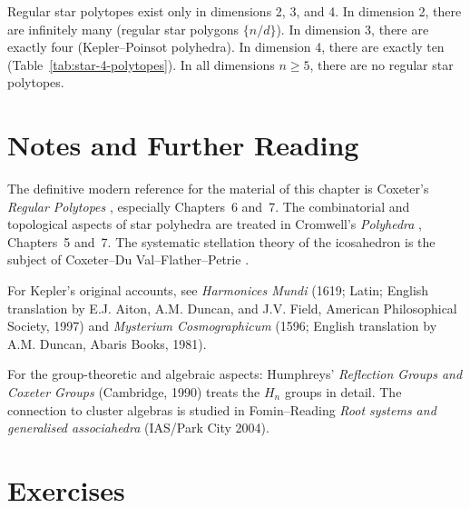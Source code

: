 \begin{theorem}
\label{thm:summary-higher-dim}
Regular star polytopes exist only in dimensions 2, 3, and 4.
In dimension 2, there are infinitely many (regular star polygons
$\{n/d\}$).  In dimension 3, there are exactly four
(Kepler–Poinsot polyhedra).  In dimension 4, there are exactly
ten (Table~\ref{tab:star-4-polytopes}).  In all dimensions
$n \geq 5$, there are no regular star polytopes.
\end{theorem}

\section{Notes and Further Reading}
\label{sec:notes}

The definitive modern reference for the material of this
chapter is Coxeter's \emph{Regular Polytopes}
\cite{coxeter_regular_polytopes}, especially Chapters~6 and~7.
The combinatorial and topological aspects of star polyhedra
are treated in Cromwell's \emph{Polyhedra}
\cite{cromwell_polyhedra}, Chapters~5 and~7.  The systematic
stellation theory of the icosahedron is the subject of
Coxeter–Du Val–Flather–Petrie \cite{coxeter_fifty_nine_icosahedra}.

For Kepler's original accounts, see \emph{Harmonices Mundi}
(1619; Latin; English translation by E.J. Aiton, A.M. Duncan,
and J.V. Field, American Philosophical Society, 1997) and
\emph{Mysterium Cosmographicum} (1596; English translation by
A.M. Duncan, Abaris Books, 1981).

For the group-theoretic and algebraic aspects:
Humphreys' \emph{Reflection Groups and Coxeter Groups}
(Cambridge, 1990) treats the $H_n$ groups in detail.
The connection to cluster algebras is studied in
Fomin–Reading \emph{Root systems and generalised associahedra}
(IAS/Park City 2004).

\section{Exercises}
\label{sec:exercises}

